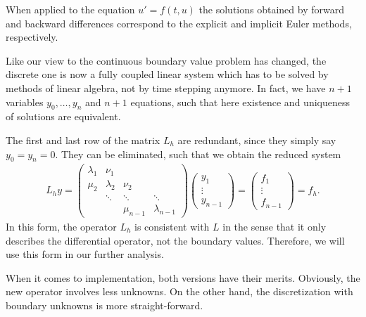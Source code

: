 \begin{remark}
  When applied to the equation $u'=f(t,u)$ the solutions obtained by
  forward and backward differences correspond to the explicit and
  implicit Euler methods, respectively.
\end{remark}





\begin{remark}
  Like our view to the continuous boundary value problem has changed,
  the discrete one is now a fully coupled linear system which has to
  be solved by methods of linear algebra, not by time stepping
  anymore. In fact, we have $n+1$ variables $y_0,\dots, y_n$ and $n+1$
  equations, such that here existence and uniqueness of solutions are
  equivalent.
\end{remark}



\begin{remark}
  The first and last row of the matrix $L_h$ are redundant, since they
  simply say $y_0 = y_n = 0$. They can be eliminated, such that we
  obtain the reduced system
  \begin{gather}
    \label{eq:fd:8}
    L_h y =
    \begin{pmatrix}
      \lambda_1 & \nu_1\\
      \mu_2 & \lambda_2 & \nu_2 \\
      & \ddots & \ddots & \ddots \\
      &&\mu_{n-1}& \lambda_{n-1}
    \end{pmatrix}
    \begin{pmatrix}
      y_1\\\vdots\\y_{n-1}
    \end{pmatrix}
    =
    \begin{pmatrix}
      f_1 \\\vdots\\f_{n-1}
    \end{pmatrix} = f_h.
  \end{gather}
  In this form, the operator $L_h$ is consistent with $L$ in the sense
  that it only describes the differential operator, not the boundary
  values. Therefore, we will use this form in our further analysis.

  When it comes to implementation, both versions have their
  merits. Obviously, the new operator involves less unknowns. On the
  other hand, the discretization with boundary unknowns is more
  straight-forward.
\end{remark}

